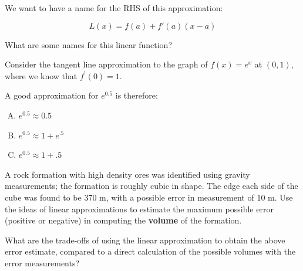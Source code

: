 \newpage
We want to have a name for the RHS of this approximation:
\begin{boxnote}
\[ L(x)=f(a) + f'(a) (x-a) 
\]
\end{boxnote}
\begin{problem}
 What are some names for this linear function?
\end{problem}


\newpage
\begin{problem}
Consider the tangent line approximation to the graph
of $f(x)=e^x$ at $(0,1)$, where we know that $f^\prime (0) = 1$. 

A good approximation for $e^{0.5}$ is therefore: \\[2ex]
\begin{enumerate}[A.]
\item $e^{0.5 }\approx 0.5$ \\[2ex]
\item $e^{0.5 }\approx 1+e^{.5}$ \\[2ex]
\item $e^{0.5 }\approx 1+.5$ \\[2ex]
\end{enumerate}

\end{problem}

\newpage
{}
\begin{problem}
  A rock formation with high density ores was identified using gravity
  measurements; the formation is roughly cubic in shape. The edge each
  side of the cube was found to be 370 m, with a possible error in
  measurement of 10 m.  Use the ideas of linear approximations to
  estimate the maximum possible error (positive or negative) in
  computing the {\bf volume} of the formation.
\end{problem}
	\vfill
	\vfill

\newpage
\problem What are the trade-offs of using the linear approximation to
obtain the above error estimate, compared to a direct calculation of
the possible volumes with the error measurements?  \vfill

\newpage


